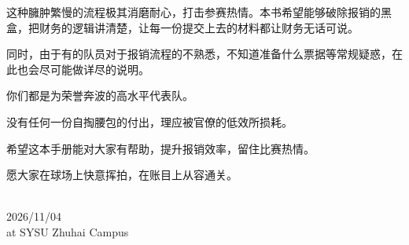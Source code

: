 这种臃肿繁慢的流程极其消磨耐心，打击参赛热情。本书希望能够破除报销的黑盒，把财务的逻辑讲清楚，让每一份提交上去的材料都让财务无话可说。

同时，由于有的队员对于报销流程的不熟悉，不知道准备什么票据等常规疑惑，在此也会尽可能做详尽的说明。

\vspace{1.5cm}

\begin{tcolorbox}[handbook,colback=white,borderline west={1.5pt}{0pt}{BookPurple},left=11pt,top=1pt,bottom=1pt,before skip=13pt,after skip=13pt,fontupper=\sffamily\bfseries\fontsize{11.75}{22}]
你们都是为荣誉奔波的高水平代表队。\par\vspace{4pt}没有任何一份自掏腰包的付出，理应被官僚的低效所损耗。
\end{tcolorbox}
\vspace{1.5cm}

希望这本手册能对大家有帮助，提升报销效率，留住比赛热情。

愿大家在球场上快意挥拍，在账目上从容通关。

\vspace{6pt}\begin{flushright}\fontsize{10.5}{18}\selectfont
{}\\
2026/11/04\\
at SYSU Zhuhai Campus
\end{flushright}
\clearpage
\restoregeometry
